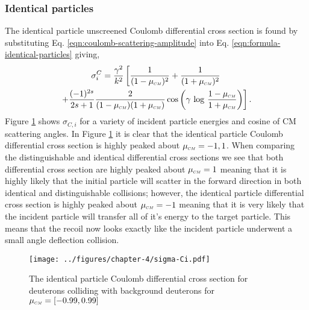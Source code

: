\subsubsection{Identical particles}
The identical particle unscreened Coulomb differential cross section is found by substituting Eq. \eqref{eqn:coulomb-scattering-amplitude} into Eq. \eqref{eqn:formula-identical-particles} giving,
\begin{multline} \label{eqn:coulomb-unscreened-identical}
   \sigma_{i}^{C} = \dfrac{\gamma^2}{k^2} \left[ \dfrac{1}{(1 - \mucm)^2} + \dfrac{1}{(1 + \mucm)^2} \right. \\ \left. + \dfrac{(-1)^{2s}}{2s+1} \dfrac{2}{(1 - \mucm)(1 + \mucm)} \cos \left( \gamma \, \log \, \dfrac{1 - \mucm}{1 + \mucm} \right) \right].
\end{multline}
Figure \ref{fig:coulomb-identical} shows $\sigma_{C,i}$ for a variety of incident particle energies and cosine of CM scattering angles. In Figure \ref{fig:coulomb-identical} it is clear that the identical particle Coulomb differential cross section is highly peaked about $\mucm = -1, 1$. When comparing the distinguishable and identical differential cross sections we see that both differential cross section are highly peaked about $\mucm = 1$ meaning that it is highly likely that the initial particle will scatter in the forward direction in both identical and distinguishable collisions; however, the identical particle differential cross section is highly peaked about $\mucm = -1$ meaning that it is very likely that the incident particle will transfer all of it's energy to the target particle. This means that the recoil now looks exactly like the incident particle underwent a small angle deflection collision.
\begin{figure}[!htb]
    \centering
    \texttt{[image: ../figures/chapter-4/sigma-Ci.pdf]}
    \caption{The identical particle Coulomb differential cross section for deuterons colliding with background deuterons for $\mucm = [-0.99,0.99]$}
    \label{fig:coulomb-identical}
\end{figure}

